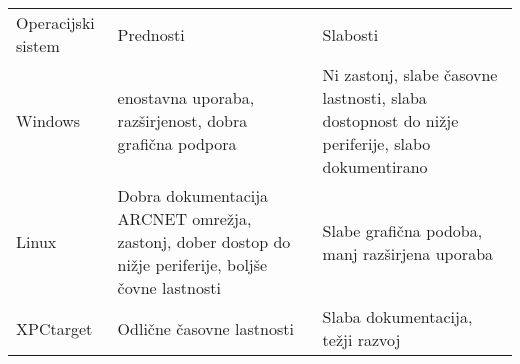 \begin{table}[h]
	\centering
	\begin{footnotesize}
		\begin{tabular}{|l l l|}
			Operacijski sistem & Prednosti & Slabosti \\
			Windows & enostavna uporaba, raz\v{s}irjenost, dobra grafi\v{c}na podpora & Ni zastonj, slabe časovne lastnosti, slaba dostopnost do ni\v{z}je periferije, slabo dokumentirano \\
			Linux & Dobra dokumentacija ARCNET omre\v{z}ja, zastonj, dober dostop do ni\v{z}je periferije, bolj\v{s}e \v{c}ovne lastnosti & Slabe grafi\v{c}na podoba, manj raz\v{s}irjena uporaba \\
			XPCtarget & Odli\v{c}ne \v{c}asovne lastnosti & Slaba dokumentacija, te\v{z}ji razvoj \\

		\end{tabular}
	\end{footnotesize}
	\label{table:udp-command}
\end{table}